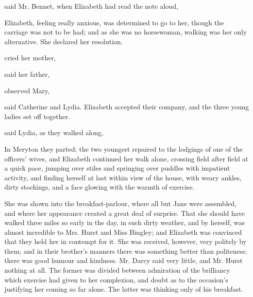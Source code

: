  said Mr. Bennet, when Elizabeth had read the note aloud, 


Elizabeth, feeling really anxious, was determined to go to her, though the carriage was not to be had; and as she was no horsewoman, walking was her only alternative. She declared her resolution.

 cried her mother, 


 said her father, 


 observed Mary, 

 said Catherine and Lydia. Elizabeth accepted their company, and the three young ladies set off together.

 said Lydia, as they walked along, 

In Meryton they parted; the two youngest repaired to the lodgings of one of the officers' wives, and Elizabeth continued her walk alone, crossing field after field at a quick pace, jumping over stiles and springing over puddles with impatient activity, and finding herself at last within view of the house, with weary ankles, dirty stockings, and a face glowing with the warmth of exercise.

She was shown into the breakfast-parlour, where all but Jane were assembled, and where her appearance created a great deal of surprise. That she should have walked three miles so early in the day, in such dirty weather, and by herself, was almost incredible to Mrs. Hurst and Miss Bingley; and Elizabeth was convinced that they held her in contempt for it. She was received, however, very politely by them; and in their brother's manners there was something better than politeness; there was good humour and kindness. Mr. Darcy said very little, and Mr. Hurst nothing at all. The former was divided between admiration of the brilliancy which exercise had given to her complexion, and doubt as to the occasion's justifying her coming so far alone. The latter was thinking only of his breakfast.

